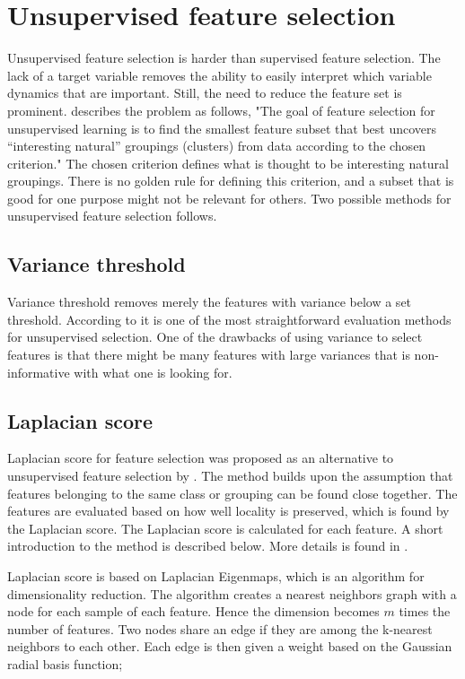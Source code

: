 \section{Unsupervised feature selection}\label{sec:unsup_feat_reduc}
    Unsupervised feature selection is harder than supervised feature selection. The lack of a target variable removes the ability to easily interpret which variable dynamics that are important. Still, the need to reduce the feature set is prominent. \cite{Dy2004} describes the problem as follows, "The goal of feature selection for unsupervised learning is to find the smallest feature subset that best uncovers “interesting natural” groupings (clusters) from data according to the chosen criterion." The chosen criterion defines what is thought to be interesting natural groupings. There is no golden rule for defining this criterion, and a subset that is good for one purpose might not be relevant for others. Two possible methods for unsupervised feature selection follows.
    
    
    \subsection{Variance threshold}\label{subsec:var_thres}
        Variance threshold removes merely the features with variance below a set threshold. According to \cite{He2005} it is one of the most straightforward evaluation methods for unsupervised selection. One of the drawbacks of using variance to select features is that there might be many features with large variances that is non-informative with what one is looking for.
        
    
    \subsection{Laplacian score}\label{subsec:lapl_score}
        Laplacian score for feature selection was proposed as an alternative to unsupervised feature selection by \cite{He2005}. The method builds upon the assumption that features belonging to the same class or grouping can be found close together. The features are evaluated based on how well locality is preserved, which is found by the Laplacian score. The Laplacian score is calculated for each feature. A short introduction to the method is described below. More details is found in \cite{He2005}. 
        
        Laplacian score is based on Laplacian Eigenmaps, which is an algorithm for dimensionality reduction. The algorithm creates a nearest neighbors graph with a node for each sample of each feature. Hence the dimension becomes $m$ times the number of features. Two nodes share an edge if they are among the k-nearest neighbors to each other. Each edge is then given a weight based on the Gaussian radial basis function;
        
